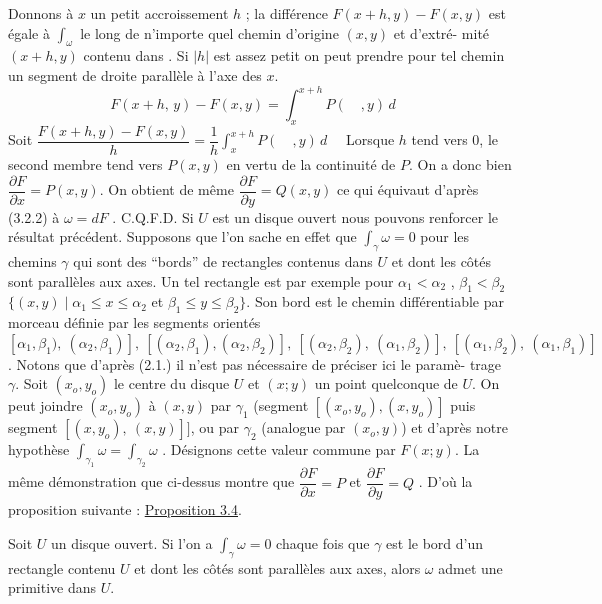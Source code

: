 
Donnons à $x$ un petit accroissement $h$ ; la différence $F(x+h,y) - F(x,y)$
est égale à $\int_\omega$ le long de n'importe quel chemin d'origine $(x,y)$ et d'extré-%
mité $(x+h,y)$ contenu dans \quad . Si $|h|$ est assez petit on peut prendre pour
tel chemin un segment de droite parallèle à l'axe des $x$.
\[ F(x+h,\,y) - F(x,y) = \int_x^{x+h} P(\quad ,y)\, d \quad \]
Soit \quad $\dfrac{F(x+h,y) - F(x,y)}{h} = \dfrac{1}{h}\displaystyle\int_x^{x+h} P(\quad ,y)\, d \quad$
Lorsque $h$ tend vers $0$, le second membre tend vers $P(x,y)$ en vertu de la
continuité de $P$. On a donc bien $\dfrac{\partial F}{\partial x} = P(x,y)$. On obtient de même $\dfrac{\partial F}{\partial y} = Q(x,y)$
ce qui équivaut d'après (3.2.2) à $\omega = dF$ . C.Q.F.D.
Si $U$ est un disque ouvert nous pouvons renforcer le résultat précédent.
Supposons que l'on sache en effet que $\int_\gamma \omega = 0$ pour les chemins $\gamma$ qui
sont des ``bords'' de rectangles contenus dans $U$ et dont les côtés sont
parallèles aux axes. Un tel rectangle est par exemple pour $\alpha_1 < \alpha_2$ ,
$\beta_1 < \beta_2$ \quad $\{(x,y) \mid \alpha_1 \leq x \leq \alpha_2$ et $\beta_1 \leq y \leq \beta_2\}$. Son bord est le chemin
différentiable par morceau définie par les segments orientés
$[\alpha_1,\beta_1),\ (\alpha_2,\beta_1)],\ [(\alpha_2,\beta_1),(\alpha_2,\beta_2)],\ [(\alpha_2,\beta_2),\ (\alpha_1,\beta_2)],\ [(\alpha_1,\beta_2),\ (\alpha_1,\beta_1)]$.
Notons que d'après (2.1.) il n'est pas nécessaire de préciser ici le paramè-%
trage $\gamma$. Soit $(x_o,y_o)$ le centre du disque $U$ et $(x;y)$ un point quelconque
de $U$. On peut joindre $(x_o,y_o)$ à $(x,y)$ par $\gamma_1$ (segment $[(x_o,y_o),(x,y_o)]$
puis segment $[(x,y_o),\ (x,y)]]$, ou par $\gamma_2$ (analogue par $(x_o,y)$) et d'après
notre hypothèse $\int_{\gamma_1} \omega = \int_{\gamma_2} \omega$ . Désignons cette valeur commune par $F(x;y)$.
La même démonstration que ci-dessus montre que $\dfrac{\partial F}{\partial x} = P$ et $\dfrac{\partial F}{\partial y} = Q$ .
D'où la proposition suivante :
\uline{Proposition 3.4}.

Soit $U$ un disque ouvert. Si l'on a $\int_\gamma \omega = 0$ chaque fois que $\gamma$
est le bord d'un rectangle contenu $U$ et dont les côtés sont parallèles aux
axes, alors $\omega$ admet une primitive dans $U$.

